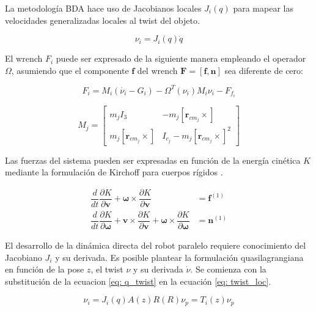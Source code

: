 La metodología BDA hace uso de Jacobianos locales $J_i(q)$
para mapear las velocidades generalizadas locales 
al twist del objeto.

\begin{equation} \label{eq: twist_loc}
\nu_i = J_i(q)\dot{q}
\end{equation}

El wrench $F_i$ puede ser expresado de la siguiente 
manera empleando el operador $\Omega$, asumiendo que el 
componente $\mathbf f$ del wrench $\mathbf F = [\mathbf f, \mathbf n]$ sea diferente de cero:

\begin{equation}
F_i = M_i(\dot{\nu_i} - G_i) - \Omega^T(\nu_i)M_i\nu_i - F_{f_{i}}
\end{equation}

\begin{equation}
 M_j = \begin{bmatrix}
        m_j I_3 & -m_j [\mathbf r_{cm_j} \times]\\
        m_j [\mathbf r_{cm_j} \times] & I_{c_j} -m_j [\mathbf r_{cm_j} \times]^2
       \end{bmatrix}
\end{equation}


Las fuerzas del sistema pueden ser expresadas en función de la 
energía cinética $K$ mediante la 
formulación de Kirchoff para cuerpos rígidos \cite{olguin20183d}.

\begin{subequations}\label{eq: kirchoff}
 \begin{align}
  \dfrac{d}{dt} \dfrac{\partial K}{\partial \mathbf v} + \boldsymbol \omega \times \dfrac{\partial K}{\partial \mathbf v} &= \mathbf f^{(1)}\\
  \dfrac{d}{dt} \dfrac{\partial K}{\partial \boldsymbol \omega} + \mathbf v \times \dfrac{\partial K}{\partial \mathbf v}  + \boldsymbol \omega \times \dfrac{\partial K}{\partial \boldsymbol \omega} &= \mathbf n^{(1)}
 \end{align}
\end{subequations}

El desarrollo de la dinámica directa del robot paralelo
requiere conocimiento del Jacobiano $J_i$ y su derivada.
Es posible plantear la formulación quasilagrangiana
en función de la pose $z$, el twist $\nu$ y su derivada $\dot \nu$.
Se comienza con la substitución de la ecuacion 
\eqref{eq: q_twist} en la ecuación \eqref{eq: twist_loc}.

\begin{equation}
\nu_i = J_i(q) A(z) R(R) \nu_p = T_i(z) \nu_p
\end{equation}

